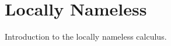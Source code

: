 
\section{Locally Nameless}\label{sec:locally-nameless}

Introduction to the locally nameless calculus.